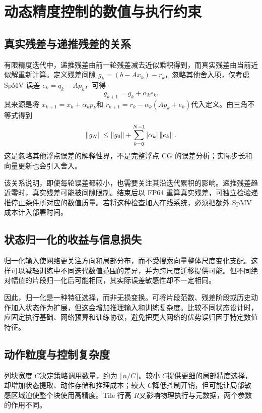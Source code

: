 \section{动态精度控制的数值与执行约束}
\subsection{真实残差与递推残差的关系}
有限精度迭代中，递推残差由前一轮残差减去近似乘积得到，而真实残差由当前近似解重新计算。定义残差间隙 $g_k=(b-Ax_k)-r_k$，忽略其他舍入项，仅考虑 SpMV 误差 $e_k=\widetilde q_k-Ap_k$，可得
\begin{equation}
 g_{k+1}=g_k+\alpha_ke_k.
\end{equation}
其来源是将 $x_{k+1}=x_k+\alpha_kp_k$和 $r_{k+1}=r_k-\alpha_k(Ap_k+e_k)$代入定义。由三角不等式得到
\begin{equation}
 \left\lVert g_N\right\rVert\leq\left\lVert g_0\right\rVert+\sum_{k=0}^{N-1}|\alpha_k|\left\lVert e_k\right\rVert.
\end{equation}
这是忽略其他浮点误差的解释性界，不是完整浮点 CG 的误差分析；实际步长和向量更新也会引入舍入。

该关系说明，即使每轮误差都较小，也需要关注其沿迭代累积的影响。递推残差趋近零时，真实残差可能被间隙限制。结束后以 FP64 重算真实残差，可独立检验递推停止条件所对应的数值质量。若将这种检查加入在线系统，必须把额外 SpMV 成本计入部署时间。

\subsection{状态归一化的收益与信息损失}
归一化输入使网络更关注方向和局部分布，而不受搜索向量整体尺度变化支配。这样可以减轻训练中不同迭代数值范围的差异，并为跨尺度迁移提供可能。但不同绝对幅值的片段归一化后可能相同，其实际误差敏感性却不一定相同。

因此，归一化是一种特征选择，而非无损变换。可将片段范数、残差阶段或历史动作加入状态作为扩展，但这会增加推理输入和训练复杂度。比较不同状态设计时，应固定执行基础、网络预算和训练协议，避免把更大网络的优势误归因于特定数值特征。

\subsection{动作粒度与控制复杂度}
列块宽度 $C$决定策略调用数量，约为 $\lceil n/C\rceil$。较小 $C$提供更细的局部精度选择，却增加状态提取、动作存储和推理成本；较大 $C$降低控制开销，但可能让局部敏感区域迫使整个块使用高精度。Tile 行高 $R$又影响物理执行与元数据，两个参数的作用不同。

